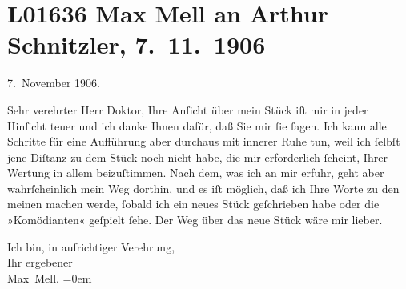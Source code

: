 

\section[Max Mell an Arthur Schnitzler, 7. 11. 1906]{L01636 Max Mell an Arthur Schnitzler, 7. 11. 1906}
\nopagebreak{}
\rehead{ }\normalsize\beginnumbering{}
\toendnotes[C]{\smallbreak\pagebreak[2]}
\toendnotes[C]{\smallbreak}
\pstart
           \raggedleft{}{\pb}7. November 1906.\pend
           
\pstart{}Sehr verehrter Herr Doktor,\pend\vspace{0.5em}
\pstart
           Ihre Anſicht über mein Stück
               iſt mir in jeder Hinſicht teuer und ich danke Ihnen dafür, daß Sie mir ſie ſagen. Ich
               kann alle Schritte für eine Aufführung aber durchaus mit innerer Ruhe tun, weil ich
               ſelbſt jene Diſtanz zu dem Stück noch nicht habe, die mir erforderlich ſcheint, Ihrer Wertung in allem
               beizuſtimmen. Nach dem, was ich an mir erfuhr, geht aber wahrſcheinlich mein Weg
               dorthin, und es iſt möglich, daß ich Ihre Worte zu den meinen machen werde, ſobald
               ich ein neues Stück geſchrieben habe oder die »Komödianten« geſpielt ſehe. Der Weg über das neue Stück wäre mir lieber.\pend
           
\pstart
           Ich bin, in aufrichtiger Verehrung,{\\[\baselineskip]}Ihr ergebener{\\[\baselineskip]}\spacefill\mbox{Max Mell.}\pend
           \leftskip=0em{}\endnumbering{}  
      